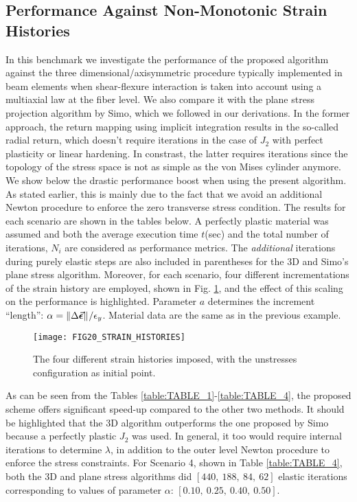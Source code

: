 \subsection{Performance Against Non-Monotonic Strain Histories}

In this benchmark we investigate the performance of the proposed algorithm 
against the three dimensional/axisymmetric procedure typically implemented in 
beam elements when shear-flexure interaction is taken into account using a 
multiaxial law at the fiber level. We also compare it with the plane stress 
projection 
algorithm by Simo\cite{Simo1985}, which we followed in our derivations. In the 
former approach, the return mapping using implicit integration results in 
the so-called radial return, which doesn't require iterations in the case of 
$J_2$ with perfect plasticity or linear hardening\cite{Wilkins1963}. In 
constrast, the latter requires iterations since the topology of the stress 
space is not as simple as the von Mises cylinder anymore. We show below the 
drastic performance boost when 
using the present algorithm. As stated earlier, this is mainly due to 
the fact that we avoid an additional Newton procedure to enforce the zero 
transverse stress condition. The results for each scenario are shown in the 
tables below. A perfectly plastic material was assumed and both the average 
execution time $t$(sec) and the total number of iterations, $N_i$ are 
considered as performance metrics. The \textit{additional} iterations during 
purely elastic steps are also included in parentheses for the 3D and Simo's 
plane stress algorithm.  Moreover, for each scenario, four 
different incrementations of the strain history are employed, shown in Fig. 
\ref{fig:FIG20_STRAIN_HISTORIES}, and the effect of 
this scaling on the performance is highlighted. Parameter $a$ determines the 
increment ``length'': $\alpha = 
\Vert\Delta\vec{\bm{\epsilon}}\Vert^{}/\epsilon_y$. Material data are the same as 
in the previous example. 

\begin{figure}[t]
	\centering
	\texttt{[image: FIG20\_STRAIN\_HISTORIES]}
	\caption{The four different strain histories imposed, with the unstresses 
		configuration as initial point.}
	\label{fig:FIG20_STRAIN_HISTORIES}
\end{figure}

As can be seen from the Tables \ref{table:TABLE_1}-\ref{table:TABLE_4}, the 
proposed scheme offers significant speed-up compared to the other two methods. 
It should be highlighted that the 3D algorithm outperforms the one proposed by 
Simo because a perfectly plastic $J_2$ was used. In 
general, it too would require internal iterations to determine $\lambda$, in 
addition to the outer level Newton procedure to enforce the stress constraints. 
For Scenario 4, shown in Table \ref{table:TABLE_4}, both the 3D and plane 
stress algorithms did $[440,\ 188,\ 84,\ 62]$ elastic iterations corresponding 
to values of parameter $\alpha$: $[0.10,\ 0.25,\ 0.40,\ 0.50]$.




